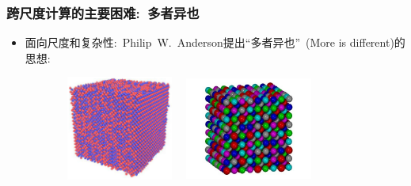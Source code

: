 \frame
{
	\frametitle{跨尺度计算的主要困难:~\textcolor[rgb]{1.00, 0.20 0.20}{多者异也}}
		\begin{itemize}
		\item 面向尺度和复杂性:~\textrm{Philip~W.~Anderson}提出``多者异也''~\textrm{(\textcolor[rgb]{0.00, 0.00, 1.00}{More is different})}的思想:~
\vskip 3pt
{\fontsize{7.2pt}{5.0pt}\selectfont{复杂体系在每一不同的聚集层次，都会呈现出许多预想不到的全新复杂物理性质，这些性质已经远超出组成基元的物理学规律}}
\begin{figure}[h!]
\vspace*{-0.05in}
\centering
\includegraphics[height=1.35in,width=1.65in,viewport=0 0 425 420,clip]{Figures/Ti-Al_alloy_model.jpg}
\includegraphics[height=1.35in,width=1.65in,viewport=55 10 335 305,clip]{Figures/high-entropy_alloys.jpg}
\label{Flow-of-multi_scale-modelling}
\end{figure}
	\end{itemize}
	{\fontsize{7.2pt}{5.0pt}}
}

